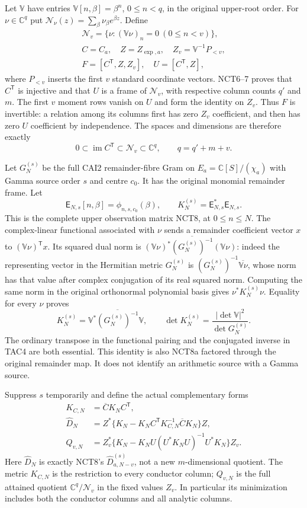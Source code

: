 \documentclass[11pt,a4paper]{article}
\begin{document}
Let $\mathbb V$ have entries $\mathbb V[n,\beta]=\beta^n$,
$0\le n<q$, in the original upper-root order.  For
$\nu\in\mathbb C^q$ put $\mathcal N_\nu(z)=\sum_\beta\nu_\beta
e^{\beta z}$.  Define
\[
\begin{gathered}
 \mathscr N_v=\{\nu:(\mathbb V\nu)_n=0\ (0\le n<v)\},
 \\ C=C_a,\quad Z=Z_{\exp,a},\quad
 Z_v=\mathbb V^{-1}P_{<v},\\
 F=[C^{\mathsf T},Z,Z_v],\quad U=[C^{\mathsf T},Z],
 \tag{TAC2}
\end{gathered}
\]
where $P_{<v}$ inserts the first $v$ standard coordinate vectors.
NCT6--7 proves that $C^{\mathsf T}$ is injective and that $U$ is a
frame of $\mathscr N_v$, with respective column counts $q'$ and $m$.
The first $v$ moment rows vanish on $U$ and form the identity on $Z_v$.
Thus $F$ is invertible: a relation among its columns first has zero
$Z_v$ coefficient, and then has zero $U$ coefficient by independence.
The spaces and dimensions are therefore exactly
\[
 0\subset\operatorname{im}C^{\mathsf T}\subset\mathscr N_v
       \subset\mathbb C^q,\qquad q=q'+m+v.
 \tag{TAC3}
\]

Let $G_N^{(s)}$ be the full CAI2 remainder-fibre Gram on
$E_a=\mathbb C[S]/(\chi_a)$ with Gamma source order $s$ and centre
$c_0$.  It has the original monomial remainder frame.  Let
\[
 \mathsf E_{N,s}[n,\beta]=\phi_{n,s,c_0}(\beta),\qquad
 K_N^{(s)}=\mathsf E_{N,s}^*\mathsf E_{N,s}.
\]
This is the complete upper observation matrix NCT8, at $0\le n\le N$.
The complex-linear functional associated with $\nu$ sends a remainder
coefficient vector $x$ to $(\mathbb V\nu)^{\mathsf T}x$.
Its squared dual norm is
$(\mathbb V\nu)^*\overline{(G_N^{(s)})^{-1}}(\mathbb V\nu)$:
indeed the representing vector in the Hermitian metric $G_N^{(s)}$ is
$(G_N^{(s)})^{-1}\overline{\mathbb V\nu}$, whose norm has that
value after complex conjugation of its real squared norm.
Computing the same norm in the original orthonormal polynomial basis
gives $\nu^*K_N^{(s)}\nu$.  Equality for every $\nu$ proves
\[
 K_N^{(s)}=\mathbb V^*\overline{(G_N^{(s)})^{-1}}\mathbb V,
 \qquad
 \det K_N^{(s)}=\frac{|\det\mathbb V|^2}{\det G_N^{(s)}}.
 \tag{TAC4}
\]
The ordinary transpose in the functional pairing and the conjugated
inverse in TAC4 are both essential.  This identity is also NCT8a
factored through the original remainder map.  It does not identify
an arithmetic source with a Gamma source.

Suppress $s$ temporarily and define the actual complementary forms
\[
 \begin{split}
 K_{C,N}&=\overline C K_N C^{\mathsf T},\\
 \widehat D_N&=Z^*\{K_N-K_NC^{\mathsf T}K_{C,N}^{-1}
                                      \overline C K_N\}Z,\\
 Q_{v,N}&=Z_v^*\{K_N-K_NU(U^*K_NU)^{-1}U^*K_N\}Z_v.
 \end{split}
 \tag{TAC5}
\]
Here $\widehat D_N$ is exactly NCT8's
$\widehat D_{a,N-v}^{(s)}$, not a new $m$-dimensional quotient.
The metric $K_{C,N}$ is the restriction to every conductor column;
$Q_{v,N}$ is the full attained quotient $\mathbb C^q/\mathscr N_v$
in the fixed values $Z_v$.  In particular its minimization includes
both the conductor columns and all analytic columns.
\end{document}
